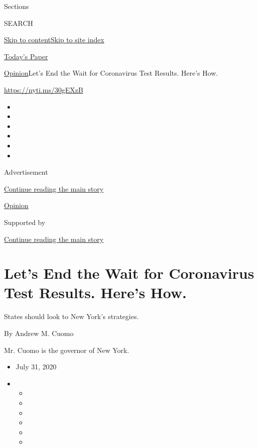 Sections

SEARCH

\protect\hyperlink{site-content}{Skip to
content}\protect\hyperlink{site-index}{Skip to site index}

\href{https://myaccount.nytimes.com/auth/login?response_type=cookie\&client_id=vi}{}

\href{https://www.nytimes.com/section/todayspaper}{Today's Paper}

\href{/section/opinion}{Opinion}\textbar{}Let's End the Wait for
Coronavirus Test Results. Here's How.

\url{https://nyti.ms/30gEXzB}

\begin{itemize}
\item
\item
\item
\item
\item
\item
\end{itemize}

Advertisement

\protect\hyperlink{after-top}{Continue reading the main story}

\href{/section/opinion}{Opinion}

Supported by

\protect\hyperlink{after-sponsor}{Continue reading the main story}

\hypertarget{lets-end-the-wait-for-coronavirus-test-results-heres-how}{%
\section{Let's End the Wait for Coronavirus Test Results. Here's
How.}\label{lets-end-the-wait-for-coronavirus-test-results-heres-how}}

States should look to New York's strategies.

By Andrew M. Cuomo

Mr. Cuomo is the governor of New York.

\begin{itemize}
\item
  July 31, 2020
\item
  \begin{itemize}
  \item
  \item
  \item
  \item
  \item
  \item
  \end{itemize}
\end{itemize}

